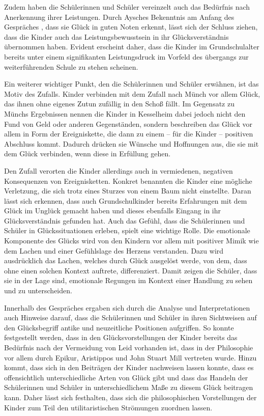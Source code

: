 Zudem haben die Schülerinnen und Schüler vereinzelt auch das Bedürfnis nach Anerkennung ihrer Leistungen. 
Durch Aysches Bekenntnis am Anfang des Gespräches , dass sie Glück in guten Noten erkennt,  lässt sich der Schluss ziehen, dass die Kinder auch das Leistungsbewusstsein in ihr Glücksverständnis übernommen haben. 
Evident erscheint daher, dass die Kinder im Grundschulalter bereits unter einem signifikanten Leistungsdruck im Vorfeld des übergangs zur weiterführenden Schule zu stehen scheinen. 

Ein weiterer wichtiger Punkt, den die Schülerinnen und Schüler erwähnen, ist das Motiv des Zufalls. 
Kinder verbinden mit dem Zufall nach Münch vor allem Glück, \glqq das ihnen ohne eigenes Zutun zufällig in den Schoß fällt.\grqq{}
Im Gegensatz zu Münchs Ergebnissen nennen die Kinder in Kesselheim dabei jedoch nicht den Fund von Geld oder anderen Gegenständen, sondern beschreiben das Glück vor allem in Form der Ereigniskette, die dann zu einem -- für die Kinder -- positiven Abschluss kommt. 
Dadurch drücken sie Wünsche und Hoffnungen aus, die sie mit dem Glück verbinden, wenn diese in Erfüllung gehen. 

Den Zufall verorten die Kinder allerdings auch in vermiedenen, negativen Konsequenzen von Ereignisketten. 
Konkret benannten die Kinder eine mögliche Verletzung, die sich trotz eines Sturzes von einem Baum nicht einstellte. 
Daran lässt sich erkennen, dass auch Grundschulkinder bereits Erfahrungen mit dem Glück im Unglück gemacht haben und dieses ebenfalls Eingang in ihr Glücksverständnis gefunden hat.
Auch das Gefühl, dass die Schülerinnen und Schüler in Glückssituationen erleben, spielt eine wichtige Rolle. 
Die emotionale Komponente des Glücks wird von den Kindern vor allem mit positiver Mimik wie dem Lachen und einer Gefühlslage des Herzens verstanden. 
Dazu wird ausdrücklich das Lachen, welches durch Glück ausgelöst werde, von dem, dass ohne einen solchen Kontext auftrete, differenziert. 
Damit zeigen die Schüler, dass sie in der Lage sind, emotionale Regungen im Kontext einer Handlung zu sehen und zu unterscheiden. 

Innerhalb des Gespräches ergaben sich durch die Analyse und Interpretationen auch Hinweise darauf, dass die Schülerinnen und Schüler in ihren Sichtweisen auf den Glücksbegriff antike und neuzeitliche Positionen aufgriffen. 
So konnte festgestellt werden, dass in den Glücksvorstellungen der Kinder bereits das Bedürfnis nach der Vermeidung von Leid vorhanden ist, dass in der Philosophie vor allem durch Epikur, Aristippos und John Stuart Mill vertreten wurde. 
Hinzu kommt, dass sich in den Beiträgen der Kinder nachweisen lassen konnte, dass es offensichtlich unterschiedliche Arten von Glück gibt und dass das Handeln der Schülerinnen und Schüler in unterschiedlichem Maße zu diesem Glück beitragen kann. 
Daher lässt sich festhalten, dass sich die philosophischen Vorstellungen der Kinder zum Teil den utilitaristischen Strömungen zuordnen lassen. 


